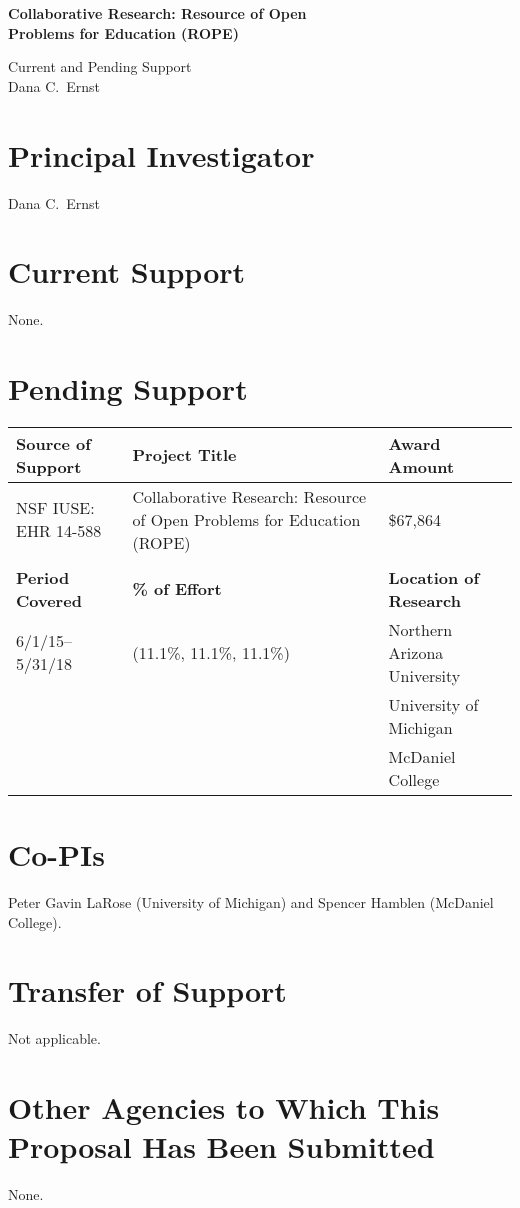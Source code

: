 \documentclass[11pt]{article}
\begin{document}
\begin{center}
{\Large \textbf{Collaborative Research: Resource of Open\\
Problems for Education (ROPE)}}

\bigskip

{\Large Current and Pending Support}\\
\smallskip
Dana C.~Ernst
\end{center}

\thispagestyle{empty}

\section{Principal Investigator}

\noindent Dana C.~Ernst

\section{Current Support}

\noindent None.

\section{Pending Support}

\begin{tabularx}{6.4in}{@{}lXl}
\hline
\textbf{Source of Support} & \textbf{Project Title} & \textbf{Award Amount} \\
\hline
NSF IUSE: EHR 14-588 & Collaborative Research: Resource of Open Problems for Education (ROPE) & \$67,864 \\
\\
\hline
\textbf{Period Covered} & \textbf{\% of Effort} & \textbf{Location of Research} \\
\hline
6/1/15--5/31/18 \ \ & (11.1\%, 11.1\%, 11.1\%) \ & Northern Arizona University \\ 
&& University of Michigan \\
&& McDaniel College\\
\end{tabularx}

\section{Co-PIs}

\noindent Peter Gavin LaRose (University of Michigan) and Spencer Hamblen (McDaniel College).

\section{Transfer of Support}

\noindent Not applicable.

\section{Other Agencies to Which This Proposal Has Been Submitted}

None.
\end{document}
